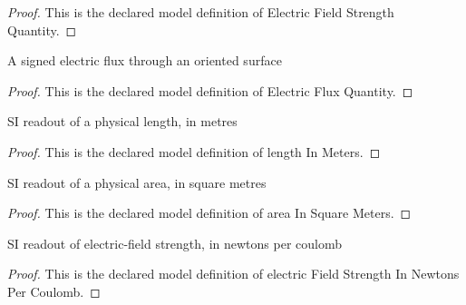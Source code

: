 \begin{proof}
  This is the declared model definition of Electric Field Strength Quantity.
\end{proof}
\begin{definition}
  \label{def:physics:phyx-mini-0846:phyxminiproblems-problemphyxmini0846-electricfluxquantity}
  A signed electric flux through an oriented surface
\end{definition}
\begin{proof}
  This is the declared model definition of Electric Flux Quantity.
\end{proof}
\begin{definition}
  \label{def:physics:phyx-mini-0846:phyxminiproblems-problemphyxmini0846-lengthinmeters}
  SI readout of a physical length, in metres
\end{definition}
\begin{proof}
  This is the declared model definition of length In Meters.
\end{proof}
\begin{definition}
  \label{def:physics:phyx-mini-0846:phyxminiproblems-problemphyxmini0846-areainsquaremeters}
  SI readout of a physical area, in square metres
\end{definition}
\begin{proof}
  This is the declared model definition of area In Square Meters.
\end{proof}
\begin{definition}
  \label{def:physics:phyx-mini-0846:phyxminiproblems-problemphyxmini0846-electricfieldstrengthinnewtonspercoulomb}
  SI readout of electric-field strength, in newtons per coulomb
\end{definition}
\begin{proof}
  This is the declared model definition of electric Field Strength In Newtons Per Coulomb.
\end{proof}
